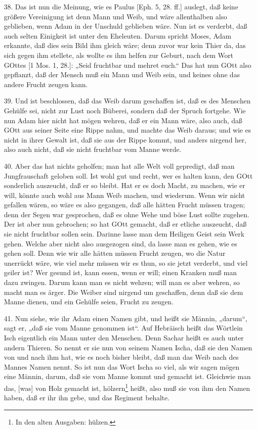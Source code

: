 38. Das ist nun die Meinung, wie es Paulus [Eph. 5, 28. ff.] auslegt, daß keine größere Vereinigung ist denn Mann und Weib, und wäre allenthalben also geblieben, wenn Adam in der Unschuld geblieben wäre. Nun ist es verderbt, daß auch selten Einigkeit ist unter den Eheleuten. Darum spricht Moses, Adam erkannte, daß dies sein Bild ihm gleich wäre; denn zuvor war kein Thier da, das sich gegen ihm stellete, als wollte es ihm helfen zur Geburt, nach dem Wort GOttes [1 Mos. 1, 28.]: „Seid fruchtbar und mehret euch.“ Das hat nun GOtt also gepflanzt, daß der Mensch muß ein Mann und Weib sein, und keines ohne das andere Frucht zeugen kann.

39. Und ist beschlossen, daß das Weib darum geschaffen ist, daß es des Menschen Gehülfe sei, nicht zur Lust noch Büberei, sondern daß der Spruch fortgehe. Wie nun Adam hier nicht hat mögen wehren, daß er ein Mann wäre, also auch, daß GOtt aus seiner Seite eine Rippe nahm, und machte das Weib daraus; und wie es nicht in ihrer Gewalt ist, daß sie aus der Rippe kommt, und anders nirgend her, also auch nicht, daß sie nicht fruchtbar vom Manne werde.

40. Aber das hat nichts geholfen; man hat alle Welt voll gepredigt, daß man Jungfrauschaft geloben soll. Ist wohl gut und recht, wer es halten kann, den GOtt sonderlich auszeucht, daß er so bleibt. Hat er es doch Macht, zu machen, wie er will, könnte auch wohl aus Mann Weib machen, und wiederum. Wenn wir nicht gefallen wären, so wäre es also gegangen, daß alle hätten Frucht müssen tragen; denn der Segen war gesprochen, daß es ohne Wehe und böse Lust sollte zugehen. Der ist aber nun gebrochen; so hat GOtt gemacht, daß er etliche auszeucht, daß sie nicht fruchtbar sollen sein. Darinne lasse man dem Heiligen Geist sein Werk gehen. Welche aber nicht also ausgezogen sind, da lasse man es gehen, wie es gehen soll. Denn wie wir alle hätten müssen Frucht zeugen, wo die Natur unerrückt wäre, wie viel mehr müssen wir es thun, so sie jetzt verderbt, und viel geiler ist? Wer gesund ist, kann essen, wenn er will; einen Kranken muß man dazu zwingen. Darum kann man es nicht wehren; will man es aber wehren, so macht man es ärger. Die Weiber sind nirgend um geschaffen, denn daß sie dem Manne dienen, und ein Gehülfe seien, Frucht zu zeugen.

41. Nun siehe, wie ihr Adam einen Namen gibt, und heißt sie Männin, „darum“, sagt er, „daß sie vom Manne genommen ist“. Auf Hebräisch heißt das Wörtlein Isch eigentlich ein Mann unter den Menschen. Denn Sachar heißt es auch unter andern Thieren. So nennt er sie nun von seinem Namen Ischa, daß sie den Namen von und nach ihm hat, wie es noch
bisher bleibt, daß man das Weib nach des Mannes Namen nennt. So ist nun das Wort Ischa so viel, als wir sagen mögen eine Männin, darum, daß sie vom Manne kommt und gemacht ist. Gleichwie man das, [was] von Holz gemacht ist, hölzern\footnote{In den alten Ausgaben: hülzen.} heißt, also muß sie von ihm den Namen haben, daß er ihr ihn gebe, und das Regiment behalte.

